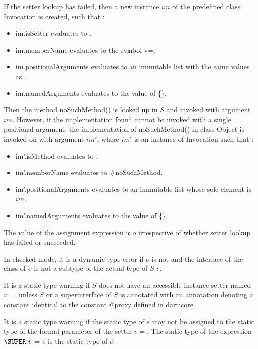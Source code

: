 \documentclass{article}
\newcommand{\code}[1]{{\sf #1}}
\begin{document}
\LMHash{}
If the setter lookup has failed, then a new instance $im$  of the predefined class  \code{Invocation}  is created, such that :
\begin{itemize}
\item  \code{im.isSetter} evaluates to \code{\TRUE{}}.
\item  \code{im.memberName} evaluates to the symbol \code{v=}.
\item \code{im.positionalArguments} evaluates to an immutable list with the same values as \code{[$o$]}.
\item \code{im.namedArguments} evaluates to the value of \code{\CONST{} \{\}}.
\end{itemize}

\LMHash{}
Then the method \code{noSuchMethod()} is looked up in $S$ and invoked  with argument $im$. 
However, if the implementation found cannot be invoked with a single positional argument, the implementation  of \code{noSuchMethod()} in class \code{Object} is invoked on \THIS{} with argument $im'$, where $im'$ is an instance of \code{Invocation} such that :
\begin{itemize}
\item  \code{im'.isMethod} evaluates to \code{\TRUE{}}.
\item  \code{im'.memberName} evaluates to \code{\#noSuchMethod}.
\item \code{im'.positionalArguments} evaluates to an immutable list whose sole element is  $im$.
\item \code{im'.namedArguments} evaluates to the value of \code{\CONST{} \{\}}.
\end{itemize}

\LMHash{}
The value of the assignment expression is $o$ irrespective of whether setter lookup has failed or succeeded.

\LMHash{}
In checked mode, it is a dynamic type error if $o$ is not \NULL{} and the interface of the class of $o$ is not a subtype of the actual type of $S.v$.

\LMHash{}
It is a static type warning if $S$ does not have an accessible instance setter named $v=$ unless $S$ or a superinterface of $S$ is annotated with an annotation denoting a constant identical to the constant \code{@proxy} defined in \code{dart:core}. 

\LMHash{}
It is a static type warning if the static type of $e$ may not be assigned to the static type of the formal parameter of the setter $v=$.   The static type of the expression $\SUPER.v$ \code{=} $e$ is the static type of $e$.
\end{document}

